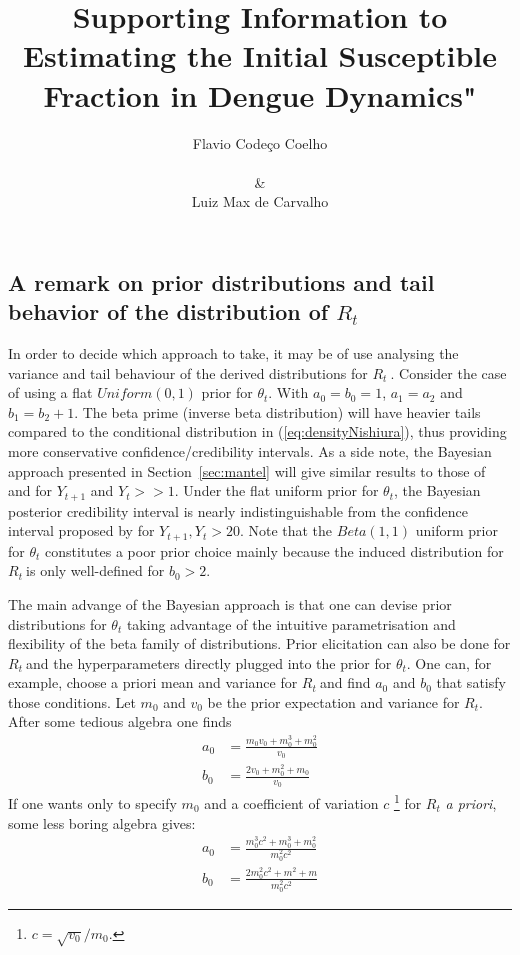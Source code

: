 \documentclass[12pt]{article}
\title{
Supporting Information to Estimating the Initial Susceptible Fraction in Dengue Dynamics"
}
\author{
Flavio Code\c{c}o Coelho \\
\\
\& \\
Luiz Max de Carvalho \\
}
\date{}
\def \rr {$R_{t}\ $}
\begin{document}
                                  
% 

%
\maketitle

\subsection*{A remark on prior distributions and tail behavior of the 
distribution of $R_t$}
\label{sec:tails}

In order to decide which approach to take, it may be of use analysing the variance and tail behaviour of the derived distributions for \rr. 
Consider the case of using a flat $Uniform(0, 1)$ prior for $\theta_t$.
With $a_0 = b_0 = 1$, $a_1 = a_2$ and $b_1 = b_2 + 1$.
The beta prime (inverse beta distribution) will have heavier tails compared to the conditional distribution in (\ref{eq:densityNishiura}), thus providing more conservative confidence/credibility intervals.  
As a side note, the Bayesian approach presented in Section~\ref{sec:mantel} will give similar results to those of \citet{wilson} and \citet{wilson} for $Y_{t+1}$ and $Y_t >> 1$.
Under the flat  uniform prior for $\theta_t$, the Bayesian posterior credibility interval is nearly indistinguishable from the confidence interval proposed by \citet{clopper} for $Y_{t+1}, Y_t > 20$.
Note that the $Beta(1, 1)$ uniform prior for $\theta_t$ constitutes a poor prior choice mainly because the induced distribution for \rr is only well-defined for $b_0 > 2$.

The main advange of the Bayesian approach is that one can devise prior distributions for $\theta_t$ taking advantage of the intuitive parametrisation and flexibility of the beta family of distributions.
Prior elicitation can also be done for \rr and the hyperparameters directly plugged into the prior for $\theta_t$. 
One can, for example, choose a priori mean and variance for \rr and find $a_0$ and $b_0$ that satisfy those conditions.
Let $m_0$ and $v_0$ be the prior expectation and variance for $R_t$. 
After some tedious algebra one finds
\begin{align}
\label{eq:elicitation}
a_0 &= \frac{m_0v_0 + m_0^3 + m_0^2}{v_0} \\
b_0 &= \frac{2v_0 + m_0^2 + m_0}{v_0}
\end{align}
If one wants only to specify $m_0$ and a coefficient of variation $c$ \footnote{$c = \sqrt{v_0}/ m_0$.} for $R_t$ \textit{a priori}, some less boring algebra gives:
\begin{align}
\label{eq:elicitationcv}
a_0 &= \frac{m_0^3c^2 + m_0^3 + m_0^2}{m_0^2c^2} \\
b_0 &= \frac{2m_0^2c^2 + m^2 + m}{m_0^2c^2}
\end{align}
\newpage

\end{document}
